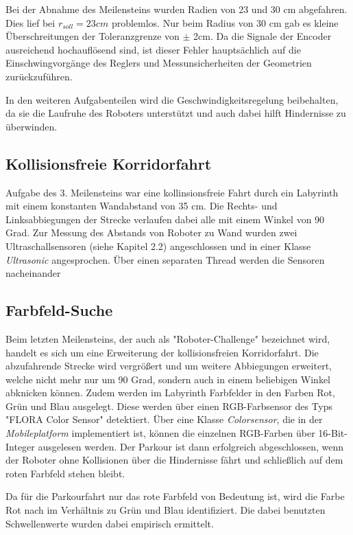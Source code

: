 \documentclass[12pt,a4paper,oneside]{article}
\begin{document}
\begin{spacing}{1.15}
\newpage
Bei der Abnahme des Meilensteins wurden Radien von 23 und 30 cm abgefahren. Dies lief bei $r_{soll} = 23 cm$ problemlos. Nur beim Radius von 30 cm gab es kleine Überschreitungen der Toleranzgrenze von $\pm$ 2cm. Da die Signale der Encoder ausreichend hochauflösend sind, ist dieser Fehler hauptsächlich auf die Einschwingvorgänge des Reglers und Messunsicherheiten der Geometrien zurückzuführen. 

In den weiteren Aufgabenteilen wird die Geschwindigkeitsregelung beibehalten, da sie die Laufruhe des Roboters unterstützt und auch dabei hilft Hindernisse zu überwinden.




	
\subsection{Kollisionsfreie Korridorfahrt}

Aufgabe des 3. Meilensteins war eine kollinsionsfreie Fahrt durch ein Labyrinth mit einem konstanten Wandabstand von 35 cm. Die Rechts- und Linksabbiegungen der Strecke verlaufen dabei alle mit einem Winkel von 90 Grad. Zur Messung des Abstands von Roboter zu Wand wurden zwei Ultraschallsensoren (siehe Kapitel 2.2) angeschlossen und in einer Klasse \textit{Ultrasonic} angesprochen. Über einen separaten Thread werden die Sensoren nacheinander 

\subsection{Farbfeld-Suche}
	
Beim letzten Meilensteins, der auch als "Roboter-Challenge" bezeichnet wird, handelt es sich um eine Erweiterung der kollisionsfreien Korridorfahrt. Die abzufahrende Strecke wird vergrößert und um weitere Abbiegungen erweitert, welche nicht mehr nur um 90 Grad, sondern auch in einem beliebigen Winkel abknicken können. Zudem werden im Labyrinth Farbfelder in den Farben Rot, Grün und Blau ausgelegt. Diese werden über einen RGB-Farbsensor des Typs "FLORA Color Sensor" detektiert. Über eine Klasse \textit{Colorsensor}, die in der \textit{Mobileplatform}  implementiert ist, können die einzelnen RGB-Farben über 16-Bit-Integer ausgelesen werden.
Der Parkour ist dann erfolgreich abgeschlossen, wenn der Roboter ohne Kollisionen über die Hindernisse fährt und schließlich auf dem roten Farbfeld stehen bleibt. 

Da für die Parkourfahrt nur das rote Farbfeld von Bedeutung ist, wird die Farbe Rot nach im Verhältnis zu Grün und Blau identifiziert. Die dabei benutzten Schwellenwerte wurden dabei empirisch ermittelt. 
	

\end{spacing}
\end{document}
